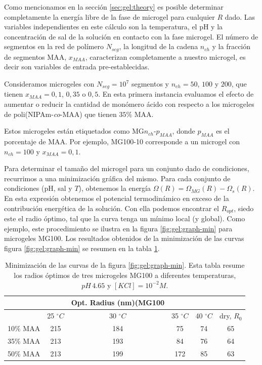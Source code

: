 Como mencionamos en la secci\'on \ref{sec:gel:theory} es posible determinar completamente la energ\'ia libre de la fase de microgel para cualquier $R$ dado.
Las variables independientes en este c\'alculo son la temperatura, el pH y la concentraci\'on de sal de la soluci\'on en contacto con la fase microgel.
El n\'umero de segmentos en la red de pol\'imero $N_{seg}$, la longitud de la cadena $n_{ch}$ y la fracci\'on de segmentos MAA, $x_{MAA}$, caracterizan completamente a nuestro microgel, es decir son variables de entrada pre-establecidas.


Consideramos microgeles con $N_{seg}=10^7$ segmentos y $n_{ch}=50$, $100$ y $200$, que tienen $x_{MAA}=0,1$, $0,35$ o $0,5$.
En esta primera instancia evaluamos el efecto de aumentar o reducir la cantidad de mon\'omero \'acido con respecto a los microgeles de poli(NIPAm-\emph{co}-MAA) que tienen $35\%$ MAA.

Estos microgeles est\'an etiquetados como MG$n_{ch}$-$p_{MAA}$, donde $p_{MAA}$ es el porcentaje de MAA.
Por ejemplo, MG100-10 corresponde a un  microgel con $n_{ch}=100$ y $x_{MAA}=0,1$.


Para determinar el tama\~no del microgel para un conjunto dado de condiciones, recurrimos a una minimizaci\'on gr\'afica del mismo.
Para cada conjunto de condiciones (pH, sal y $T$), obtenemos la energ\'ia $\Omega(R)=\Omega_{MG}(R)-\Omega_{s}(R)$. En esta expresi\'on obtenemos el potencial termodin\'amico en exceso de la contribuci\'on energ\'etica de la soluci\'on.
Con ella podemos encontrar el $R_{opt }$, siedo este el radio \'optimo, tal que la curva tenga un m\'inimo local (y global).
Como ejemplo, este procedimiento se ilustra en la figura \ref{fig:gel:graph-min} para microgeles MG100.
Los resultados obtenidos de la minimizaci\'on de las curvas figura \ref{fig:gel:graph-min} se resumen en la tabla \ref{table:gel:optimal-R}.

\begin{table}[!htb]
\centering
\small
  \begin{tabular}{|lccccc|}
   \hline %
    	&&   Opt. Radius (nm)(MG100 & && \\
    	\hline
      & {25 $^\circ C$} & {30 $^\circ C$} & {35 $^\circ C$} & {40 $^\circ C$} & {dry, $R_0$} \\
      \hline
    10\% MAA & 215 &  184 &  75  &  74 & 65\\
    35\% MAA &  213 &  193 &  84 & 76 & 64\\
    50\% MAA &  213 & 199 &  172 & 85 & 63\\
    \hline
  \end{tabular}
 \caption{Minimizaci\'on de las curvas de la  figura \ref{fig:gel:graph-min}.
 	Esta tabla resume los radios \'optimos de tres microgeles MG100 a diferentes temperaturas, $pH\,4.65$ y $[KCl]=10^{-2}M$.}
\label{table:gel:optimal-R} 
\end{table}


